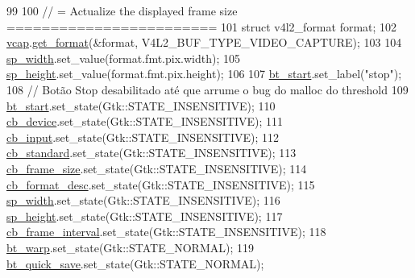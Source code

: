\begin{DoxyCode}
99 
100             \textcolor{comment}{// = Actualize the displayed frame size ========================}
101             \textcolor{keyword}{struct }v4l2\_format format;
102             \hyperlink{class_v_s_s_s___g_u_i_1_1_v4_l_interface_a7ece61f4ccc6d5321c445e60f34e7f33}{vcap}.\hyperlink{classv4lcap_aa5c521438e06e14625c05a02bafd35c1}{get\_format}(&format, V4L2\_BUF\_TYPE\_VIDEO\_CAPTURE);
103 
104             \hyperlink{class_v_s_s_s___g_u_i_1_1_v4_l_interface_a0f492cb2c65c4021c9b9b81f4a185e84}{sp\_width}.set\_value(format.fmt.pix.width);
105             \hyperlink{class_v_s_s_s___g_u_i_1_1_v4_l_interface_a7b095a3a9dc7a5895f3bac68b05b8210}{sp\_height}.set\_value(format.fmt.pix.height);
106 
107             \hyperlink{class_v_s_s_s___g_u_i_1_1_v4_l_interface_a95958ffffbfb95a6a0fdefb2ffa6d3b9}{bt\_start}.set\_label(\textcolor{stringliteral}{"stop"});
108             \textcolor{comment}{// Botão Stop desabilitado até que arrume o bug do malloc do threshold}
109             \hyperlink{class_v_s_s_s___g_u_i_1_1_v4_l_interface_a95958ffffbfb95a6a0fdefb2ffa6d3b9}{bt\_start}.set\_state(Gtk::STATE\_INSENSITIVE);
110             \hyperlink{class_v_s_s_s___g_u_i_1_1_v4_l_interface_a9aebd92fe12b9b5acc25b1113dbd022e}{cb\_device}.set\_state(Gtk::STATE\_INSENSITIVE);
111             \hyperlink{class_v_s_s_s___g_u_i_1_1_v4_l_interface_af7c647eefb3e6f7cf8e0fdc170619922}{cb\_input}.set\_state(Gtk::STATE\_INSENSITIVE);
112             \hyperlink{class_v_s_s_s___g_u_i_1_1_v4_l_interface_ae78aa74f420bbb92b59ff0e0f0ac3b1e}{cb\_standard}.set\_state(Gtk::STATE\_INSENSITIVE);
113             \hyperlink{class_v_s_s_s___g_u_i_1_1_v4_l_interface_ad6dd4704d3b7d1f262843dd148269b73}{cb\_frame\_size}.set\_state(Gtk::STATE\_INSENSITIVE);
114             \hyperlink{class_v_s_s_s___g_u_i_1_1_v4_l_interface_a1f6b2f08ccbc0ecbfba96311ac07aa44}{cb\_format\_desc}.set\_state(Gtk::STATE\_INSENSITIVE);
115             \hyperlink{class_v_s_s_s___g_u_i_1_1_v4_l_interface_a0f492cb2c65c4021c9b9b81f4a185e84}{sp\_width}.set\_state(Gtk::STATE\_INSENSITIVE);
116             \hyperlink{class_v_s_s_s___g_u_i_1_1_v4_l_interface_a7b095a3a9dc7a5895f3bac68b05b8210}{sp\_height}.set\_state(Gtk::STATE\_INSENSITIVE);
117             \hyperlink{class_v_s_s_s___g_u_i_1_1_v4_l_interface_ad07b3bbad672e676e128f19a12f07e73}{cb\_frame\_interval}.set\_state(Gtk::STATE\_INSENSITIVE);
118             \hyperlink{class_v_s_s_s___g_u_i_1_1_v4_l_interface_a6cdcc092c26848cd7009e56084ee1b23}{bt\_warp}.set\_state(Gtk::STATE\_NORMAL);
119             \hyperlink{class_v_s_s_s___g_u_i_1_1_v4_l_interface_a424118f056f71fba97d881f4647f7555}{bt\_quick\_save}.set\_state(Gtk::STATE\_NORMAL);

\end{DoxyCode}
